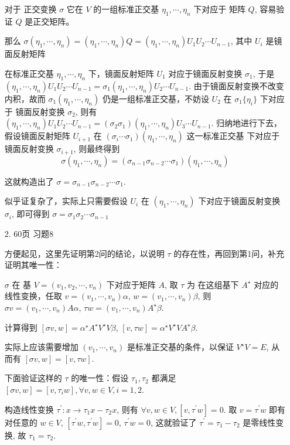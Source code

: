 \documentclass{article}
\begin{document}
\begin{spacing}{1.5}
\begin{enumerate}
    对于 正交变换 $\sigma$ 它在 $V$ 的一组标准正交基 $\eta_1, \cdots, \eta_n$ 下对应于 矩阵 $Q$, 容易验证 $Q$ 是正交矩阵。

    那么 $\sigma(\eta_1, \cdots, \eta_n) = (\eta_1, \cdots, \eta_n) Q = (\eta_1, \cdots, \eta_n)U_1U_2\cdots U_{n-1} $, 其中 $U_i$ 是镜面反射矩阵

    在标准正交基 $\eta_1, \cdots, \eta_n$ 下，镜面反射矩阵 $U_1$ 对应于镜面反射变换 $\sigma_1$, 于是 $(\eta_1, \cdots, \eta_n)U_1U_2\cdots U_{n-1} = \sigma_1(\eta_1, \cdots, \eta_n) U_2\cdots U_{n-1}$. 由于镜面反射变换不改变内积，故而 $\sigma_1(\eta_1,\cdots,\eta_n)$ 仍是一组标准正交基，不妨设 $U_2$ 在 $\sigma_1\{\eta_i\}$ 下对应于 镜面反射变换 $\sigma_2$, 则有 $(\eta_1, \cdots,\eta_n)U_1U_2\cdots U_{n-1} = (\sigma_2\sigma_1)(\eta_1,\cdots,\eta_n)U_3\cdots U_{n-1}$. 归纳地进行下去，假设镜面反射矩阵 $U_{i+1}$ 在 $(\sigma_i\cdots \sigma_1)(\eta_1, \cdots, \eta_n)$ 这一标准正交基 下对应于 镜面反射变换 $\sigma_{i+1}$, 则最终得到 
    $$\sigma(\eta_1,\cdots,\eta_n) = (\sigma_{n-1}\sigma_{n-2}\cdots\sigma_1)(\eta_1,\cdots,\eta_n)$$

    这就构造出了 $\sigma = \sigma_{n-1}\sigma_{n-2}\cdots \sigma_1$.

    似乎证复杂了，实际上只需要假设 $U_i$ 在 $(\eta_1, \cdots, \eta_n)$ 下对应于镜面反射变换 $\sigma_i$, 即可得到 $\sigma = \sigma_1\sigma_2\cdots \sigma_{n-1}$

    \item [2.] 60页 习题8

    方便起见，这里先证明第2问的结论，以说明 $\tau$ 的存在性，再回到第1问，补充证明其唯一性：

    $\sigma$ 在 基 $V=(v_1,v_2, \cdots, v_n)$ 下对应于矩阵 $A$, 取 $\tau$ 为 在这组基下 $A^\star$ 对应的线性变换，任取 $v = (v_1, \cdots, v_n)\alpha$, $w = (v_1,\cdots, v_n)\beta$, 则 $\sigma v = (v_1,\cdots, v_n)A\alpha$, $\tau w = (v_1,\cdots, v_n)A^\star\beta$. 
    
    计算得到 $[\sigma v, w] = \alpha^\star A^\star V^\star V \beta$, $[v, \tau w] = \alpha^\star V^\star VA^\star \beta$.
    
    实际上应该需要增加 $(v_1, \cdots, v_n)$ 是标准正交基的条件，以保证 $V^\star V = E$, 从而有 $[\sigma v, w] = [v, \tau w]$.

    下面验证这样的 $\tau$ 的唯一性：假设 $\tau_1, \tau_2$ 都满足 $[\sigma v, w] = [v, \tau_i w], \forall v, w\in V, i=1,2$. 
    
    构造线性变换 $\tau^\prime : x \to \tau_1 x - \tau_2 x$, 则有 $\forall  v, w\in V, [v, \tau^\prime w] = 0$. 取 $v=\tau^\prime w$ 即有 对任意的 $w\in V$, $[\tau^\prime w, \tau^\prime w] = 0$, $\tau^\prime w = 0$, 这就验证了 $\tau^\prime = \tau_1 - \tau_2$ 是零线性变换, 故 $\tau_1 = \tau_2$.


\end{enumerate}
\end{spacing}
\end{document}
